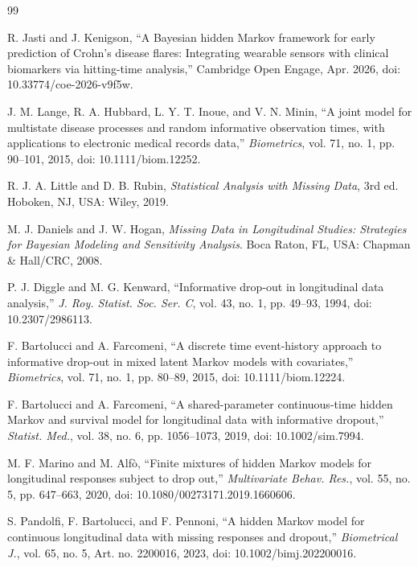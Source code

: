 \documentclass{ieeeaccess}
\begin{document}
\balance
\begin{thebibliography}{99}

 R. Jasti and J. Kenigson, ``A Bayesian hidden Markov framework for early prediction of Crohn's disease flares: Integrating wearable sensors with clinical biomarkers via hitting-time analysis,'' Cambridge Open Engage, Apr. 2026, doi: 10.33774/coe-2026-v9f5w.

 J. M. Lange, R. A. Hubbard, L. Y. T. Inoue, and V. N. Minin, ``A joint model for multistate disease processes and random informative observation times, with applications to electronic medical records data,'' \emph{Biometrics}, vol. 71, no. 1, pp. 90--101, 2015, doi: 10.1111/biom.12252.

 R. J. A. Little and D. B. Rubin, \emph{Statistical Analysis with Missing Data}, 3rd ed. Hoboken, NJ, USA: Wiley, 2019.

 M. J. Daniels and J. W. Hogan, \emph{Missing Data in Longitudinal Studies: Strategies for Bayesian Modeling and Sensitivity Analysis}. Boca Raton, FL, USA: Chapman \& Hall/CRC, 2008.

 P. J. Diggle and M. G. Kenward, ``Informative drop-out in longitudinal data analysis,'' \emph{J. Roy. Statist. Soc. Ser. C}, vol. 43, no. 1, pp. 49--93, 1994, doi: 10.2307/2986113.

 F. Bartolucci and A. Farcomeni, ``A discrete time event-history approach to informative drop-out in mixed latent Markov models with covariates,'' \emph{Biometrics}, vol. 71, no. 1, pp. 80--89, 2015, doi: 10.1111/biom.12224.

 F. Bartolucci and A. Farcomeni, ``A shared-parameter continuous-time hidden Markov and survival model for longitudinal data with informative dropout,'' \emph{Statist. Med.}, vol. 38, no. 6, pp. 1056--1073, 2019, doi: 10.1002/sim.7994.

 M. F. Marino and M. Alf\`o, ``Finite mixtures of hidden Markov models for longitudinal responses subject to drop out,'' \emph{Multivariate Behav. Res.}, vol. 55, no. 5, pp. 647--663, 2020, doi: 10.1080/00273171.2019.1660606.

 S. Pandolfi, F. Bartolucci, and F. Pennoni, ``A hidden Markov model for continuous longitudinal data with missing responses and dropout,'' \emph{Biometrical J.}, vol. 65, no. 5, Art. no. 2200016, 2023, doi: 10.1002/bimj.202200016.


\end{thebibliography}
\end{document}
